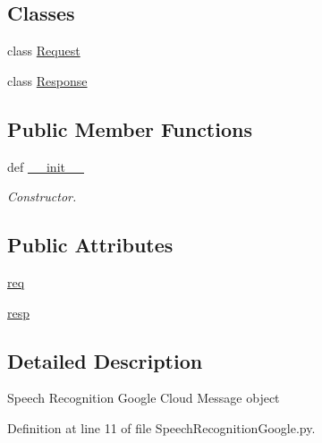 \subsection*{Classes}
\begin{DoxyCompactItemize}
\item 
class \hyperlink{classRappCloud_1_1CloudMsgs_1_1SpeechRecognitionGoogle_1_1SpeechRecognitionGoogle_1_1Request}{Request}
\item 
class \hyperlink{classRappCloud_1_1CloudMsgs_1_1SpeechRecognitionGoogle_1_1SpeechRecognitionGoogle_1_1Response}{Response}
\end{DoxyCompactItemize}
\subsection*{Public Member Functions}
\begin{DoxyCompactItemize}
\item 
def \hyperlink{classRappCloud_1_1CloudMsgs_1_1SpeechRecognitionGoogle_1_1SpeechRecognitionGoogle_aeb46f42acb89431e7f10fed324be0943}{\-\_\-\-\_\-init\-\_\-\-\_\-}
\begin{DoxyCompactList}\small\item\em Constructor. \end{DoxyCompactList}\end{DoxyCompactItemize}
\subsection*{Public Attributes}
\begin{DoxyCompactItemize}
\item 
\hyperlink{classRappCloud_1_1CloudMsgs_1_1SpeechRecognitionGoogle_1_1SpeechRecognitionGoogle_a985fd527982facb0c4d6d2cc94206779}{req}
\item 
\hyperlink{classRappCloud_1_1CloudMsgs_1_1SpeechRecognitionGoogle_1_1SpeechRecognitionGoogle_a4b4839e3499956bd0062b1cb19317700}{resp}
\end{DoxyCompactItemize}


\subsection{Detailed Description}
\begin{DoxyVerb}Speech Recognition Google Cloud Message object \end{DoxyVerb}
 

Definition at line 11 of file Speech\-Recognition\-Google.\-py.



